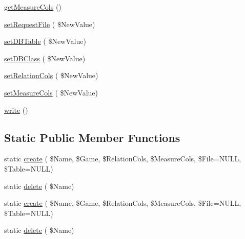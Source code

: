 \begin{DoxyCompactItemize}
\item 
\hyperlink{class_analysis_aa2139069d2b1f559a9df6f690c8cf076}{get\+Measure\+Cols} ()
\item 
\hyperlink{class_analysis_ab921506f207e5b174d3cdef504721169}{set\+Request\+File} ( \$New\+Value)
\item 
\hyperlink{class_analysis_a3d36fa472e9426224299a2b2fd03bc48}{set\+D\+B\+Table} ( \$New\+Value)
\item 
\hyperlink{class_analysis_aabddf37a4240bafefd66b2bbff1b3058}{set\+D\+B\+Class} ( \$New\+Value)
\item 
\hyperlink{class_analysis_a860325e3da00ea1d669f0d458b66be5f}{set\+Relation\+Cols} ( \$New\+Value)
\item 
\hyperlink{class_analysis_ab4f8d5dc30e551e9687dc5021b824f45}{set\+Measure\+Cols} ( \$New\+Value)
\item 
\hyperlink{class_analysis_a809e7010f2899e515a43f8c8840a1e86}{write} ()
\end{DoxyCompactItemize}
\subsection*{Static Public Member Functions}
\begin{DoxyCompactItemize}
\item 
static \hyperlink{class_analysis_a866904091e0a8982224710f557dcfb52}{create} ( \$Name, \$Game, \$Relation\+Cols, \$Measure\+Cols, \$File=N\+U\+LL, \$Table=N\+U\+LL)
\item 
static \hyperlink{class_analysis_a68eb05f2f03dae12ec9be8a5137fb27d}{delete} ( \$Name)
\item 
static \hyperlink{class_analysis_a866904091e0a8982224710f557dcfb52}{create} ( \$Name, \$Game, \$Relation\+Cols, \$Measure\+Cols, \$File=N\+U\+LL, \$Table=N\+U\+LL)
\item 
static \hyperlink{class_analysis_a68eb05f2f03dae12ec9be8a5137fb27d}{delete} ( \$Name)
\end{DoxyCompactItemize}
